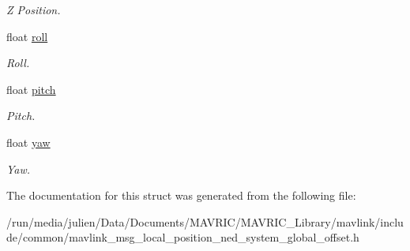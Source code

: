 \begin{DoxyCompactItemize}
\begin{DoxyCompactList}\small\item\em Z Position. \end{DoxyCompactList}\item 
\hypertarget{struct____mavlink__local__position__ned__system__global__offset__t_ad4d99c9821f0ee3d85c2a0eba615a8c8}{float \hyperlink{struct____mavlink__local__position__ned__system__global__offset__t_ad4d99c9821f0ee3d85c2a0eba615a8c8}{roll}}\label{struct____mavlink__local__position__ned__system__global__offset__t_ad4d99c9821f0ee3d85c2a0eba615a8c8}

\begin{DoxyCompactList}\small\item\em Roll. \end{DoxyCompactList}\item 
\hypertarget{struct____mavlink__local__position__ned__system__global__offset__t_abf94231c7acd5e41896e5fdf98cd0128}{float \hyperlink{struct____mavlink__local__position__ned__system__global__offset__t_abf94231c7acd5e41896e5fdf98cd0128}{pitch}}\label{struct____mavlink__local__position__ned__system__global__offset__t_abf94231c7acd5e41896e5fdf98cd0128}

\begin{DoxyCompactList}\small\item\em Pitch. \end{DoxyCompactList}\item 
\hypertarget{struct____mavlink__local__position__ned__system__global__offset__t_a2a919917ced7545167d6f588d6c8f0ef}{float \hyperlink{struct____mavlink__local__position__ned__system__global__offset__t_a2a919917ced7545167d6f588d6c8f0ef}{yaw}}\label{struct____mavlink__local__position__ned__system__global__offset__t_a2a919917ced7545167d6f588d6c8f0ef}

\begin{DoxyCompactList}\small\item\em Yaw. \end{DoxyCompactList}\end{DoxyCompactItemize}


The documentation for this struct was generated from the following file\+:\begin{DoxyCompactItemize}
\item 
/run/media/julien/\+Data/\+Documents/\+M\+A\+V\+R\+I\+C/\+M\+A\+V\+R\+I\+C\+\_\+\+Library/mavlink/include/common/mavlink\+\_\+msg\+\_\+local\+\_\+position\+\_\+ned\+\_\+system\+\_\+global\+\_\+offset.\+h\end{DoxyCompactItemize}
